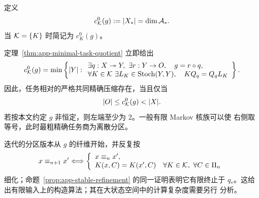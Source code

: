 \begin{definition}[核族的精确任务相对闭合复杂度]
\label{def:app-exact-complexity}
定义
\begin{equation}
 c_{\mathcal K}^{0}(g):=|X_*|=\dim\mathcal A_*.
 \label{eq:app-exact-complexity}
\end{equation}
当 $\mathcal K=\{K\}$ 时简记为 $c_K^0(g)$。
\end{definition}

定理~\ref{thm:app-minimal-task-quotient} 立即给出
\begin{equation}
 c_{\mathcal K}^{0}(g)=
 \min\left\{|Y|:
 \begin{array}{l}
 \exists q:X\twoheadrightarrow Y,\ \exists r:Y\to O,\quad g=r\circ q,\\
 \forall K\in\mathcal K\ \exists L_K\in\operatorname{Stoch}(Y,Y),\quad KQ_q=Q_qL_K
 \end{array}\right\}.
 \label{eq:app-exact-complexity-min}
\end{equation}
因此，任务相对的严格共同精确压缩存在，当且仅当
\begin{equation}
  |O|\le c_{\cK}^{0}(g)<|X|.
  \label{eq:app-nontrivial-exact}
\end{equation}
若按本文约定 $g$ 非恒定，则左端至少为 $2$。一般有限 Markov 核族可以使
右侧取等号，此时最粗精确任务商为离散分区。

迭代的分区版本从 $g$ 的纤维开始，并反复按
\[
 x\equiv_{n+1}x'
 \Longleftrightarrow
 \left\{
 \begin{array}{l}
 x\equiv_nx',\\
 K(x,C)=K(x',C)
 \quad\forall K\in\mathcal K,\ \forall C\in\Pi_n
 \end{array}\right.
\]
细化；命题~\ref{prop:app-stable-refinement} 的同一证明表明它有限终止于
$q_*$。这给出有限输入上的构造算法；其在大状态空间中的计算复杂度需要另行
分析。
